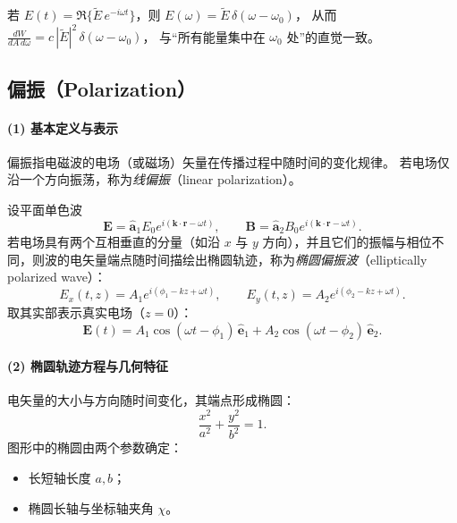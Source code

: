 \begin{derivationnote}[单色波的检查]
若 $E(t)=\Re\{ \tilde{E}\,e^{-i\omega t}\}$，则 $E(\omega)=\tilde{E}\,\delta(\omega-\omega_0)$，
从而 $\frac{dW}{dA\,d\omega}=c\,|\tilde{E}|^2\,\delta(\omega-\omega_0)$，
与“所有能量集中在 $\omega_0$ 处”的直觉一致。
\end{derivationnote}

\subsection{偏振（Polarization）}

\paragraph{(1) 基本定义与表示}
偏振指电磁波的电场（或磁场）矢量在传播过程中随时间的变化规律。
若电场仅沿一个方向振荡，称为\emph{线偏振}（linear polarization）。

设平面单色波
\begin{equation}
  \mathbf{E} = \hat{\mathbf{a}}_1 E_0 e^{i(\mathbf{k}\cdot\mathbf{r}-\omega t)}, \qquad
  \mathbf{B} = \hat{\mathbf{a}}_2 B_0 e^{i(\mathbf{k}\cdot\mathbf{r}-\omega t)} .
\end{equation}
若电场具有两个互相垂直的分量（如沿 $x$ 与 $y$ 方向），并且它们的振幅与相位不同，则波的电矢量端点随时间描绘出椭圆轨迹，称为\emph{椭圆偏振波}（elliptically polarized wave）：
\begin{equation}
  E_x(t,z) = A_1 e^{i(\phi_1 - kz + \omega t)},\qquad
  E_y(t,z) = A_2 e^{i(\phi_2 - kz + \omega t)} .
\end{equation}
取其实部表示真实电场（$z=0$）：
\begin{equation}
  \mathbf{E}(t)
  = A_1 \cos(\omega t - \phi_1)\,\hat{\mathbf{e}}_1
  + A_2 \cos(\omega t - \phi_2)\,\hat{\mathbf{e}}_2 .
\end{equation}

\paragraph{(2) 椭圆轨迹方程与几何特征}
电矢量的大小与方向随时间变化，其端点形成椭圆：
\[
\frac{x^2}{a^2}+\frac{y^2}{b^2}=1 .
\]
图形中的椭圆由两个参数确定：
\begin{itemize}[leftmargin=2em]
  \item 长短轴长度 $a,b$；
  \item 椭圆长轴与坐标轴夹角 $\chi$。
\end{itemize}

